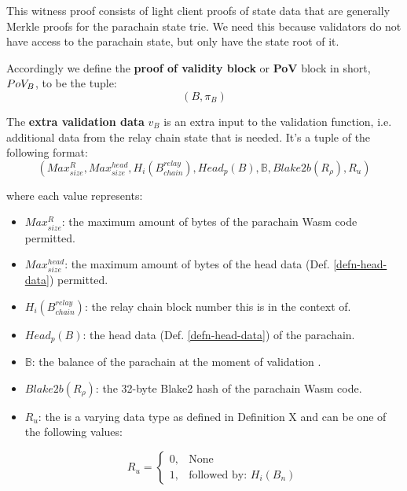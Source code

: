 This witness proof consists of light client proofs of state data that are
generally Merkle proofs for the parachain state trie.  We need this because
validators do not have access to the parachain state, but only have the state
root of it.

\begin{definition}
  \label{defn-pov-block}
  Accordingly we define the {\bf proof of validity block} or {\bf PoV} block in
  short, {\bf $PoV_B$}, to be the tuple:
  \[
  (B, \pi_B)
  \]
\end{definition}

\begin{definition}  \label{defn-extra-validation-data}
  The \textbf{extra validation data} $v_B$  is an extra input to the validation
  function, i.e. additional data from the relay chain state that is needed.
  It's a tuple of the following format:
  \[
  (Max^{R}_{size}, Max^{head}_{size}, H_i(B^{relay}_{chain}), Head_p(B), \mathbb{B}, Blake2b(R_\rho), R_u)
  \]

  where each value represents:

  \begin{itemize}
    \item $Max^{R}_{size}$: the maximum amount of bytes of the parachain Wasm code
    permitted.
    \item $Max^{head}_{size}$: the maximum amount of bytes of the head data
    (Def. \ref{defn-head-data}) permitted.
    \item $H_i(B^{relay}_{chain})$: the relay chain block number this is in the
    context of.
    \item $Head_p(B)$: the head data (Def. \ref{defn-head-data}) of the parachain.
    \item $\mathbb{B}$: the balance of the parachain at the moment of validation .
    \item $Blake2b(R_\rho)$: the 32-byte Blake2 hash of the parachain Wasm code.
    \item $R_u$: the  is a varying data type as defined in Definition X
     and can be one of the following values:

    \begin{equation*}
      R_u =
      \begin{cases}
        0, & \text{None} \\
        1, & \text{followed by: } H_i(B_n)
      \end{cases}
    \end{equation*}
  \end{itemize}


\end{definition}
